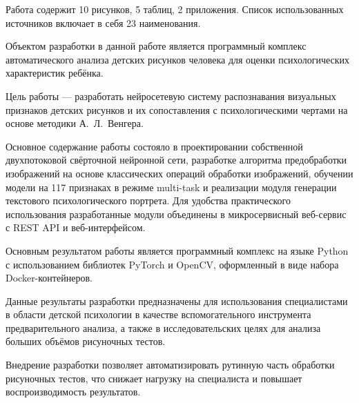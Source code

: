 \abstract %


Работа содержит 10 рисунков, 5 таблиц, 2 приложения. Список использованных источников включает в себя 23 наименования.

Объектом разработки в данной работе является программный комплекс автоматического анализа детских рисунков человека для оценки психологических характеристик ребёнка.

Цель работы --- разработать нейросетевую систему распознавания визуальных признаков детских рисунков и их сопоставления с психологическими чертами на основе методики А.~Л.~Венгера.

Основное содержание работы состояло в проектировании собственной двухпотоковой свёрточной нейронной сети, разработке алгоритма предобработки изображений на основе классических операций обработки изображений, обучении модели на 117 признаках в режиме multi-task и реализации модуля генерации текстового психологического портрета. Для удобства практического использования разработанные модули объединены в микросервисный веб-сервис с REST API и веб-интерфейсом.

Основным результатом работы является программный комплекс на языке Python с использованием библиотек PyTorch и OpenCV, оформленный в виде набора Docker-контейнеров.

Данные результаты разработки предназначены для использования специалистами в области детской психологии в качестве вспомогательного инструмента предварительного анализа, а также в исследовательских целях для анализа больших объёмов рисуночных тестов.

Внедрение разработки позволяет автоматизировать рутинную часть обработки рисуночных тестов, что снижает нагрузку на специалиста и повышает воспроизводимость результатов.
